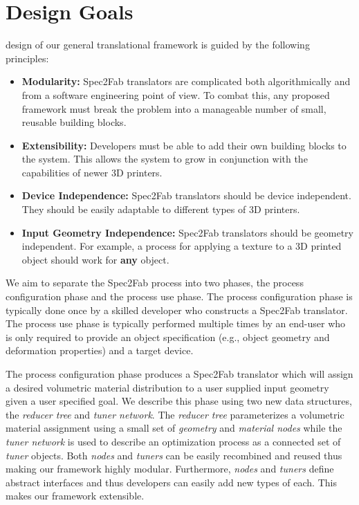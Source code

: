\chapter{Design Goals}
\label{chap:design}
 design of our general translational framework is guided by the following principles:

\begin{itemize}

\item \textbf{Modularity:} Spec2Fab translators are complicated both algorithmically and from a software engineering point of view. To combat this, any proposed framework must break the problem into a manageable number of small, reusable building blocks. 

\item \textbf{Extensibility:} Developers must be able to add their own building blocks to the system. This allows the system to grow in conjunction with the capabilities of newer 3D printers.
\vspace{-0.25\baselineskip}

\item \textbf{Device Independence:} Spec2Fab translators should be device independent. They should be easily adaptable to different types of 3D printers.
\item \textbf{Input Geometry Independence:} Spec2Fab translators should be geometry independent. For example, a process for applying a texture to a 3D printed object should work for \textbf{any} object.
\vspace{-0.25\baselineskip}
\end{itemize}

We aim to separate the Spec2Fab process into two phases, the process configuration phase and the process use phase. The process configuration phase is typically done once by a skilled developer who  constructs a Spec2Fab translator. The process use phase is typically performed multiple times by an end-user who is only required to provide an object specification (e.g., object geometry and deformation properties) and a target device. 

	The process configuration phase produces a Spec2Fab translator which will assign a desired volumetric material distribution to a user supplied input geometry given a user specified goal. We describe this phase using two new data structures, the \emph{reducer tree} and \emph{tuner network}. The \emph{reducer tree} parameterizes a volumetric material assignment using a small set of \emph{geometry} and \emph{material nodes} while the \emph{tuner network} is used to describe an optimization process as a connected set of \emph{tuner} objects.  Both \emph{nodes} and \emph{tuners} can be easily recombined and reused thus making  our framework highly modular. Furthermore,  \emph{nodes} and \emph{tuners} define abstract interfaces and thus developers can easily add new types of each. This makes our framework extensible.
	
